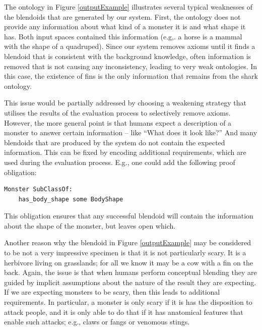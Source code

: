 \documentclass[letterpaper]{article}
\begin{document}
The ontology in Figure \ref{outputExample} illustrates several typical weaknesses 
of the blendoids that are generated by our system.
 First, the ontology does not provide any information about what kind of a monster it is 
 and what shape it has. Both input spaces contained this information 
 (e.g,. a horse is a  mammal with the shape of a quadruped). 
Since our system removes axioms until it finds a blendoid that is consistent with the background knowledge,
often information is removed that is not causing any inconsistency, leading to  very weak ontologies.  In this case, the existence of fins is the only
information that remains from the shark ontology.

This issue would be partially addressed by choosing  a weakening strategy 
that utilises the results of the evaluation process to selectively remove axioms. 
However, the more general point is that humans expect a description of a monster to answer certain information -- like ``What does it look like?'' 
And many blendoids that are produced by the system  do not contain the expected information.
This can be fixed by encoding additional requirements, 
which are used during the evaluation process. E.g., one could add the following proof obligation: 
\begin{lstlisting}[basicstyle=\ttfamily\scriptsize,language=dolText,morekeywords={props,excluding,ObjectProperty,
Class,DisjointUnionOf,SubClassOf,Characteristics,Transitive,Asymmetric,SubPropertyOf,
DisjointClasses,EquivalentTo,Asymmetric,inverse,only,forall,iff,if,or,exists,
bridge,distributed},escapechar=@,mathescape,alsolanguage=owl2Manchester]
Monster SubClassOf:
    has_body_shape some BodyShape
\end{lstlisting}
This obligation ensures that any successful blendoid will contain the information about the shape of the monster, but leaves open which. 

Another reason why the blendoid in Figure \ref{outputExample} may 
be considered to be not a very impressive specimen is that it is not particularly
scary. It is a herbivore living on grasslands; for all we know it may
be a cow with a fin on the back. Again, the issue is that when humans
perform conceptual blending they are guided by implicit assumptions 
about the nature of the result they are expecting. If we are
expecting monsters to be scary, then this leads to additional requirements.
In particular, a monster is only scary if it is has the disposition to
attack people, and it is only able to do that if it has anatomical
features that enable such attacks; e.g., claws or fangs or venomous stings. 
 
\end{document}
